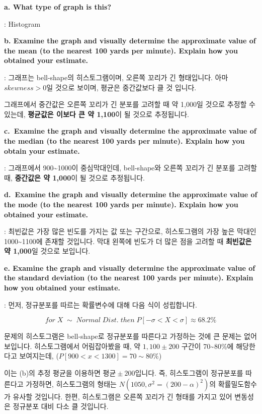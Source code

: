 \documentclass[
  a4paper,
  DIV=11,
  numbers=noendperiod]{scrreprt}
\begin{document}
\textbf{a. What type of graph is this?}

: Histogram

\textbf{b. Examine the graph and visually determine the approximate
value of the mean (to the nearest 100 yards per minute). Explain how you
obtained your estimate.}

: 그래프는 bell-shape의 히스토그램이며, 오른쪽 꼬리가 긴 형태입니다.
아마 \(skewness>0\)일 것으로 보이며, 평균은 중간값보다 클 것 입니다.

그래프에서 중간값은 오른쪽 꼬리가 긴 분포를 고려할 때 약 1,000일 것으로
추정할 수 있는데, \textbf{평균값은 이보다 큰 약 1,100}이 될 것으로
추정됩니다.

\textbf{c.~Examine the graph and visually determine the approximate
value of the median (to the nearest 100 yards per minute). Explain how
you obtain your estimate.}

: 그래프에서 900\textasciitilde1000이 중심막대인데, bell-shape와 오른쪽
꼬리가 긴 분포를 고려할 때, \textbf{중간값은 약 1,000}이 될 것으로
추정됩니다.

\textbf{d.~Examine the graph and visually determine the approximate
value of the mode (to the nearest 100 yards per minute). Explain how you
obtained your estimate.}

: 최빈값은 가장 많은 빈도를 가지는 값 또는 구간으로, 히스토그램의 가장
높은 막대인 1000\textasciitilde1100에 존재할 것입니다. 막대 왼쪽에
빈도가 더 많은 점을 고려할 때 \textbf{최빈값은 약 1,000}일 것으로
보입니다.

\textbf{e. Examine the graph and visually determine the approximate
value of the standard deviation (to the nearest 100 yards per minute).
Explain how you obtained your estimate.}

: 먼저, 정규분포를 따르는 확률변수에 대해 다음 식이 성립합니다.

\[for\;X\;\sim\;Normal\;Dist.\;then\;P[-\sigma<X<\sigma]\approx 68.2\%\]

문제의 히스토그램은 bell-shape로 정규분포를 따른다고 가정하는 것에 큰
문제는 없어보입니다. 히스토그램에서 어림잡아봤을 때, 약 \(1,100\pm 200\)
구간이 70\textasciitilde80\%에 해당한다고 보여지는데,
(\(P[900<x<1300]=70\sim80\%\))

이는 (b)의 추정 평균을 이용하면 \(평균\pm 200\)입니다. 즉, 히스토그램이
정규분포를 따른다고 가정하면, 히스토그램의 형태는
\(N(1050,\sigma^2=(200-\alpha)^2)\)의 확률밀도함수가 유사할 것입니다.
한편, 히스토그램은 오른쪽 꼬리가 긴 형태를 가지고 있어 변동성은 정규분포
대비 다소 클 것입니다.
\end{document}
